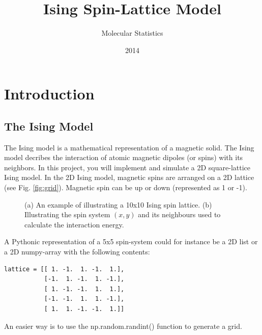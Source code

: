 \documentclass{article}
\title{Ising Spin-Lattice Model}
\author{Molecular Statistics}
\date{2014}
\begin{document}


\maketitle

\section{Introduction}

\subsection{The Ising Model}

The Ising model is a mathematical representation of a magnetic solid. The Ising model decribes the interaction of atomic magnetic dipoles (or spins) with its neighbors. In this project, you will implement and simulate a 2D square-lattice Ising model.
In the 2D Ising model, magnetic spins are arranged on a 2D lattice (see Fig. \ref{fig:grid}).
Magnetic spin can be up or down (represented as 1 or -1). 

\begin{figure}[h!]
  \centering
  \qquad %
  \qquad %
  \qquad %
  \caption{
    (a) An example of illustrating a 10x10 Ising spin lattice.
    (b) Illustrating the spin system $(x,y)$ and its neighbours used to calculate
    the interaction energy.
  }
\end{figure}


A Pythonic representation of a 5x5 spin-system could for instance be a 2D list or a 2D numpy-array with the following contents:
\begin{lstlisting}
lattice = [[ 1. -1.  1. -1.  1.],
           [-1.  1. -1.  1. -1.],
           [ 1. -1. -1.  1.  1.],
           [-1. -1.  1.  1. -1.],
           [ 1.  1. -1. -1.  1.]]
\end{lstlisting}
An easier way is to use the np.random.randint() function to generate a grid.
\end{document}
